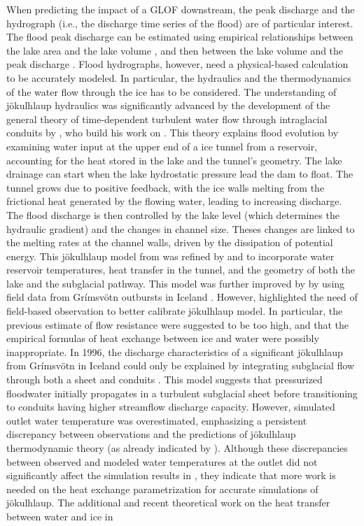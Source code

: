 When predicting the impact of a GLOF downstream, the peak discharge and the hydrograph (i.e., the discharge time series of the flood) are of particular interest. The flood peak discharge can be estimated using empirical relationships between the lake area and the lake volume \citep{Evans1986, Huggel&al2002, Cook&Quincey2015}, and then between the lake volume and the peak discharge \citep{Clague&Mathews1973, Haeberli1983, Costa1985, Evans1986, Walder&OConnor1997, Huggel&al2002}. Flood hydrographs, however, need a physical-based calculation to be accurately modeled. In particular, the hydraulics and the thermodynamics of the water flow through the ice has to be considered. The understanding of jökulhlaup hydraulics was significantly advanced by the development of the general theory of time-dependent turbulent water flow through intraglacial conduits by \cite{Nye1976}, who build his work on \cite{Roethlisberger1972,Shreve1972,Weertman1972}. This theory explains flood evolution by examining water input at the upper end of a ice tunnel from a reservoir, accounting for the heat stored in the lake and the tunnel's geometry. The lake drainage can start when the lake hydrostatic pressure lead the dam to float. The tunnel grows due to positive feedback, with the ice walls melting from the frictional heat generated by the flowing water, leading to increasing discharge. The flood discharge is then controlled by the lake level (which determines the hydraulic gradient) and the changes in channel size. Theses changes are linked to the melting rates at the channel walls, driven by the dissipation of potential energy. This jökulhlaup model from \cite{Nye1976} was refined by \cite{Spring&Hutter1981} and \cite{Clarke1982} to incorporate water reservoir temperatures, heat transfer in the tunnel, and the geometry of both the lake and the subglacial pathway. This model was further improved by \cite{Clarke2003} by using field data from Grímsvötn outbursts in Iceland \citep[see][]{Bjornsson2010}. However, \cite{Clarke2003} highlighted the need of field-based observation to better calibrate jökulhlaup model. In particular, the previous estimate of flow resistance were suggested to be too high, and that the empirical formulas of heat exchange between ice and water were possibly inappropriate. In 1996, the discharge characteristics of a significant jökulhlaup from Grímsvötn in Iceland \citep{Bjornsson1996} could only be explained by integrating subglacial flow through both a sheet and conduits \citep{Flowers&al2004}. This model suggests that pressurized floodwater initially propagates in a turbulent subglacial sheet before transitioning to conduits having higher streamflow discharge capacity. However, simulated outlet water temperature was overestimated, emphasizing a persistent discrepancy between observations and the predictions of jökulhlaup thermodynamic theory (as already indicated by \cite{Clarke2003}). Although these discrepancies between observed and modeled water temperatures at the outlet did not significantly affect the simulation results in \cite{Flowers&al2004}, they indicate that more work is needed on the heat exchange parametrization for accurate simulations of jökulhlaup. The additional and recent theoretical work on the heat transfer between water and ice in 